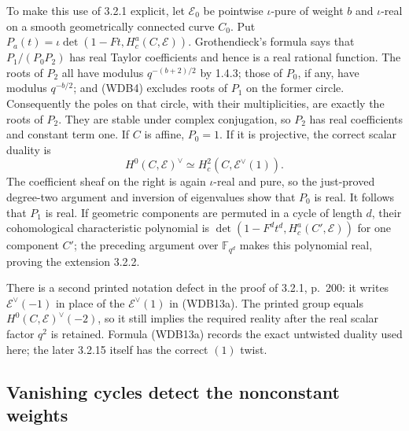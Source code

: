 To make this use of 3.2.1 explicit, let \(\mathcal E_0\) be
pointwise \(\iota\)-pure of weight \(b\) and \(\iota\)-real on
a smooth geometrically connected curve \(C_0\). Put
\(P_a(t)=\iota\det(1-Ft,H_c^a(C,\mathcal E))\).
Grothendieck's formula says that \(P_1/(P_0P_2)\) has real Taylor
coefficients and hence is a real rational function. The roots of
\(P_2\) all have modulus \(q^{-(b+2)/2}\) by 1.4.3; those of
\(P_0\), if any, have modulus \(q^{-b/2}\); and (WDB4) excludes
roots of \(P_1\) on the former circle. Consequently the poles on
that circle, with their multiplicities, are exactly the roots of
\(P_2\). They are stable under complex conjugation, so \(P_2\)
has real coefficients and constant term one. If \(C\) is affine,
\(P_0=1\). If it is projective, the correct scalar duality is
\[
 H^0(C,\mathcal E)^\vee
    \simeq H_c^2(C,\mathcal E^\vee(1)).
 \tag{WDB13a}
\]
The coefficient sheaf on the right is again \(\iota\)-real and
pure, so the just-proved degree-two argument and inversion of
eigenvalues show that \(P_0\) is real. It follows that \(P_1\)
is real. If geometric components are permuted in a cycle of length
\(d\), their cohomological characteristic polynomial is
\(\det(1-F^d t^d,H_c^a(C',\mathcal E))\) for one component
\(C'\); the preceding argument over \(\mathbb F_{q^d}\)
makes this polynomial real, proving the extension 3.2.2.

There is a second printed notation defect in the proof of 3.2.1,
p.~200: it writes \(\mathcal E^\vee(-1)\) in place of the
\(\mathcal E^\vee(1)\) in (WDB13a). The printed group equals
\(H^0(C,\mathcal E)^\vee(-2)\), so it still implies the required
reality after the real scalar factor \(q^2\) is retained. Formula
(WDB13a) records the exact untwisted duality used here; the later
3.2.15 itself has the correct \((1)\) twist.

\subsection{Vanishing cycles detect the nonconstant weights}

